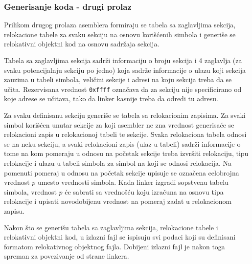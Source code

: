 \subsubsection{Generisanje koda - drugi prolaz}
Prilikom drugog prolaza asemblera formiraju se tabela sa zaglavljima sekcija,
relokacione tabele za svaku sekciju na osnovu korišćenih simbola i generiše
se relokativni objektni kod na osnovu sadržaja sekcija.

Tabela sa zaglavljima sekcija
sadrži informaciju o broju sekcija i 4 zagla\-vlja (za svaku potencijalnju
sekciju po jedno) koja sadrže informacije o ulazu koji sekcija zauzima u
tabeli simbola, veličini sekcije i adresi na koju sekcija treba da se učita.
Rezervisana vrednost \texttt{0xffff} označava da za sekciju nije specificirano od koje
adrese se učitava, tako da linker kasnije treba da odredi tu adresu.

Za svaku definisanu sekciju generiše se tabela sa relokacionim zapisima.
Za svaki simbol korišćen unutar sekcije za koji asembler ne zna vrednost
generisaće se relokacioni zapis u relokacionoj tabeli te sekcije.
Svaka reloka\-ciona tabela odnosi se na neku sekciju, a svaki relokacioni zapis
(ulaz u tabeli) sadrži informacije o tome na kom pomeraju u odnosu na početak
sekcije treba izvršiti relokaciju, tipu relokacije i ulazu u tabeli simbola
za simbol na koji se odnosi relokacija. Na pomenuti pomeraj u odnosu na početak
sekcije upisuje se označena celobrojna vrednost $p$ umesto vrednosti simbola.
Kada linker izgradi sopstvenu
tabelu simbola, vrednost $p$ će sabrati sa vrednošću koju izračuna na osnovu
tipa relokacije i upisati novodobijenu vrednost na pomeraj zadat u relokacionom zapisu.

Nakon što se generišu tabela sa zaglavljima sekcija, relokacione tabele i relokativni
objektni kod, u izlazni fajl se ispisuju svi podaci koji su definisani formatom
relokativnog objektnog fajla. Dobijeni izlazni fajl je nakon toga spreman za
povezivanje od strane linkera.


